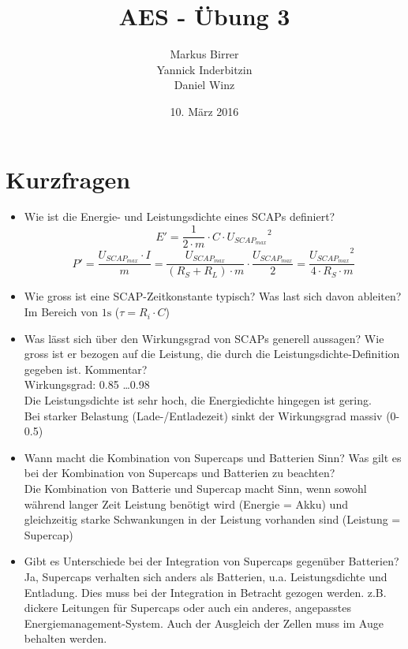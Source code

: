 \documentclass[a4,paper,fleqn]{article}
\title{AES - Übung 3}
\date{10. März 2016}
\author{Markus Birrer \\
        Yannick Inderbitzin\\
        Daniel Winz}
\begin{document}
\maketitle
\vfill
\tableofcontents
\vfill
\clearpage

\section{Kurzfragen}
\begin{itemize}
\item Wie ist die Energie- und Leistungsdichte eines SCAPs definiert? \\
    \[ E' = \frac{1}{2 \cdot m} \cdot C \cdot {U_{SCAP_{max}}}^{2} \]
    \[ P' = \frac{U_{SCAP_{max}} \cdot I}{m} 
    = \frac{U_{SCAP{_{max}}}}{\left(R_{S} + R_{L}\right) \cdot m} 
    \cdot \frac{U_{SCAP_{max}}}{2} 
    = \frac{{U_{SCAP_{max}}}^{2}}{4 \cdot R_{S} \cdot m} \]
\item Wie gross ist eine SCAP-Zeitkonstante typisch? Was last sich davon 
ableiten? \\
    Im Bereich von $1\si{\second}$ ($\tau = R_{i} \cdot C$)
\item Was lässt sich über den Wirkungsgrad von SCAPs generell aussagen? Wie 
gross ist er bezogen auf die Leistung, die durch die 
Leistungsdichte-Definition gegeben ist. Kommentar? \\
    Wirkungsgrad: 0.85 \ldots 0.98 \\
    Die Leistungsdichte ist sehr hoch, die Energiedichte hingegen ist gering. \\
    Bei starker Belastung (Lade-/Entladezeit) sinkt der Wirkungsgrad massiv 
    (0-0.5) \\
\item Wann macht die Kombination von Supercaps und Batterien Sinn? Was gilt es 
bei der Kombination von Supercaps und Batterien zu beachten? \\
    Die Kombination von Batterie und Supercap macht Sinn, wenn sowohl während 
    langer Zeit Leistung benötigt wird (Energie = Akku) und gleichzeitig 
    starke Schwankungen in der Leistung vorhanden sind (Leistung = Supercap)
\item Gibt es Unterschiede bei der Integration von Supercaps gegenüber 
Batterien? \\
    Ja, Supercaps verhalten sich anders als Batterien, u.a. Leistungsdichte 
    und Entladung. Dies muss bei der Integration in Betracht gezogen werden. 
    z.B. dickere Leitungen für Supercaps oder auch ein anderes, angepasstes 
    Energiemanagement-System. Auch der Ausgleich der Zellen muss im Auge 
    behalten werden.
\end{itemize}
\end{document}

